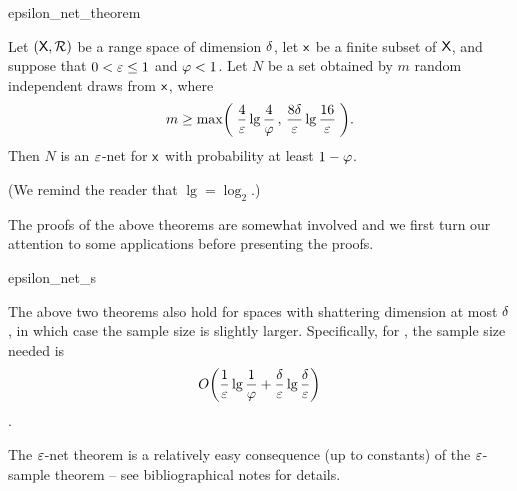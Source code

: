 
\begin{fragment}{epsilon_net_theorem}
    \begin{theorem}
        Let $(\textsf{X},{\mathcal{R}})$ be a range s{}p\-ace of \VC dimension
        $\delta$, let $\mathsf{x}$ be a finite subset of $\textsf{X}$,
        and suppose that $0 < {\varepsilon} \leq 1$ and $\varphi < 1$. Let $N$
        be a set obtained by $m$ random independent draws from
        $\mathsf{x}$, where
        \begin{equation}
            m \geq \max\pth{\;
               \frac{4}{\eps} \lg \frac{4}{\BadProb} \,,\,
               \frac{8\Dim}{\eps}\lg \frac{16}{\eps} \;}.
            \eqlab{e:net}
        \end{equation}
        Then $N$ is an ${\varepsilon}$-net for $\mathsf{x}$ with probability
        at least $1-\varphi$.
    \end{theorem}
\end{fragment}

(We remind the reader that $\lg=\log_2$.)


The proofs of the above theorems are somewhat involved and we first
turn our attention to some applications before presenting the proofs.

\begin{fragment}{epsilon_net_s}
    \begin{remark}
        The above two theorems also hold for spaces with shattering
        dimension at most $\delta$, in which case the sample size is
        slightly larger.  Specifically, for , the
        sample size needed is
        \begin{equation*}
            \ds O\pth{ \frac{1}{\eps} \lg
               \frac{1}{\BadProb} + \frac{\Dim}{\eps}\lg \frac{\Dim}{\eps}
            }
        \end{equation*}.        
    \end{remark}
\end{fragment}

\begin{remark}
    The ${\varepsilon}$-net theorem is a relatively easy consequence (up to
    constants) of the ${\varepsilon}$-sample theorem -- see bibliographical
    notes for details.
\end{remark}

